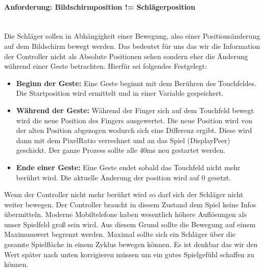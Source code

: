 \paragraph{Anforderung: Bildschirmposition != Schlägerposition}
\mbox{}\\
Die Schläger sollen in Abhängigkeit einer Bewegung, also einer Positionsänderung auf dem Bildschirm bewegt werden. Das bedeutet für uns das wir die Information der Controller nicht als Absolute Positionen sehen sondern eher die Änderung während einer Geste betrachten.
\newline
Hierfür sei folgendes Festgelegt:
\begin{itemize}
	\item 
	      \textbf{Beginn der Geste:} Eine Geste beginnt mit dem Berühren des Touchfeldes. Die Startposition wird ermittelt und in einer Variable gespeichert.
	\item
	      \textbf{Während der Geste:} Während der Finger sich auf dem Touchfeld bewegt wird die neue Position des Fingers ausgewertet. Die neue Position wird von der alten Position abgezogen wodurch sich eine Differenz ergibt. Diese wird dann mit dem PixelRatio verrechnet und an das Spiel (DisplayPeer) geschickt.
	      \newline
	      Der ganze Prozess sollte alle 40ms neu gestartet werden.
	\item
	      \textbf{Ende einer Geste: } Eine Geste endet sobald das Touchfeld nicht mehr berührt wird. Die aktuelle Änderung der position wird auf 0 gesetzt.
\end{itemize}
Wenn der Controller nicht mehr berührt wird so darf sich der Schläger nicht weiter bewegen. Der Controller braucht in diesem Zustand dem Spiel keine Infos übermitteln.
\newline
Moderne Mobiltelefone haben wesentlich höhere Auflösungen als unser Spielfeld groß sein wird. Aus diesem Grund sollte die Bewegung auf einem Maximumwert begrenzt werden.
\newline 
Maximal sollte sich ein Schläger über die gesamte Spielfläche in einem Zyklus bewegen können. Es ist denkbar das wir den Wert später nach unten korrigieren müssen um ein gutes Spielgefühl schaffen zu können.

